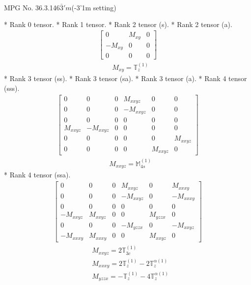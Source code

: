 \documentclass[fleqn,8pt,landscape]{jsarticle}
\begin{document}
\setcounter{MaxMatrixCols}{32}

\renewcommand{\tablename}{Table~}
\renewcommand{\figurename}{Figure~}
\begin{center}
\LARGE
MPG No. 36.3.146\quad$\bar{3}'m$\quad(-3'1m setting)
\end{center}
* Rank 0 tensor.
* Rank 1 tensor.
* Rank 2 tensor (s).
* Rank 2 tensor (a).
\begin{align*}
\begin{bmatrix} 0 & M_{xy} & 0 \\ - M_{xy} & 0 & 0 \\ 0 & 0 & 0 \end{bmatrix}
\end{align*}
\begin{align*}
& M_{xy} = \mathbb{T}_{z}^{(1)}
\end{align*}
* Rank 3 tensor (ss).
* Rank 3 tensor (sa).
* Rank 3 tensor (a).
* Rank 4 tensor (sss).
\begin{align*}
\begin{bmatrix} 0 & 0 & 0 & M_{xxyz} & 0 & 0 \\ 0 & 0 & 0 & - M_{xxyz} & 0 & 0 \\ 0 & 0 & 0 & 0 & 0 & 0 \\ M_{xxyz} & - M_{xxyz} & 0 & 0 & 0 & 0 \\ 0 & 0 & 0 & 0 & 0 & M_{xxyz} \\ 0 & 0 & 0 & 0 & M_{xxyz} & 0 \end{bmatrix}
\end{align*}
\begin{align*}
& M_{xxyz} = \mathbb{M}_{4s}^{(1)}
\end{align*}
* Rank 4 tensor (ssa).
\begin{align*}
\begin{bmatrix} 0 & 0 & 0 & M_{xxyz} & 0 & M_{xxxy} \\ 0 & 0 & 0 & - M_{xxyz} & 0 & - M_{xxxy} \\ 0 & 0 & 0 & 0 & 0 & 0 \\ - M_{xxyz} & M_{xxyz} & 0 & 0 & M_{yzzx} & 0 \\ 0 & 0 & 0 & - M_{yzzx} & 0 & - M_{xxyz} \\ - M_{xxxy} & M_{xxxy} & 0 & 0 & M_{xxyz} & 0 \end{bmatrix}
\end{align*}
\begin{align*}
& M_{xxyz} = 2 \mathbb{T}_{3c}^{(1)} \\
& M_{xxxy} = 2 \mathbb{T}_{z}^{(1)} - 2 \mathbb{T}_{z}^{\alpha(1)} \\
& M_{yzzx} = - \mathbb{T}_{z}^{(1)} - 4 \mathbb{T}_{z}^{\alpha(1)}
\end{align*}
\end{document}
